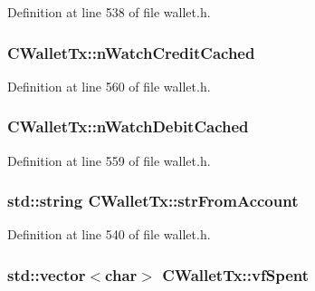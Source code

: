 Definition at line 538 of file wallet.\+h.

\hypertarget{class_c_wallet_tx_ad5585350b3917d52e0f0c54fbd8f48ba}{}
\subsubsection[{n\+Watch\+Credit\+Cached}]{ C\+Wallet\+Tx\+::n\+Watch\+Credit\+Cached\hspace{0.3cm}{\ttfamily [mutable]}}\label{class_c_wallet_tx_ad5585350b3917d52e0f0c54fbd8f48ba}


Definition at line 560 of file wallet.\+h.

\hypertarget{class_c_wallet_tx_aae59608618174f5c2dc4fa6036ffb76b}{}
\subsubsection[{n\+Watch\+Debit\+Cached}]{ C\+Wallet\+Tx\+::n\+Watch\+Debit\+Cached\hspace{0.3cm}{\ttfamily [mutable]}}\label{class_c_wallet_tx_aae59608618174f5c2dc4fa6036ffb76b}


Definition at line 559 of file wallet.\+h.

\hypertarget{class_c_wallet_tx_a099b5ca562f8a8378124b345b9123f25}{}
\subsubsection[{str\+From\+Account}]{\setlength{\rightskip}{0pt plus 5cm}std\+::string C\+Wallet\+Tx\+::str\+From\+Account}\label{class_c_wallet_tx_a099b5ca562f8a8378124b345b9123f25}


Definition at line 540 of file wallet.\+h.

\hypertarget{class_c_wallet_tx_a32c09e049302518c81f80c4f1f85583b}{}
\subsubsection[{vf\+Spent}]{\setlength{\rightskip}{0pt plus 5cm}std\+::vector$<$char$>$ C\+Wallet\+Tx\+::vf\+Spent}\label{class_c_wallet_tx_a32c09e049302518c81f80c4f1f85583b}


